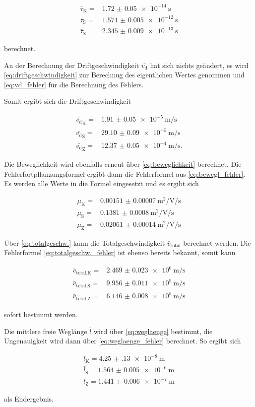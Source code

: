 \begin{align*}
    \bar{\tau}_\text{K} =& \SI{1.72(5)e-14}{\second} \\
    \bar{\tau}_\text{S} =& \SI{1.571(5)e-12}{\second} \\
    \bar{\tau}_\text{Z} =& \SI{2.345(9)e-13}{\second}
\end{align*}

berechnet.

An der Berechnung der Driftgeschwindigkeit $\bar{v_\text{d}}$ hat sich nichts geändert, es wird \autoref{eq:driftgeschwindigkeit} zur Berechnug des eigentlichen Wertes genommen und \autoref{eq:vd_fehler} für die Berechnung des Fehlers.

Somit ergibt sich die Driftgeschwindigkeit

\begin{align*}
    \bar{v_\text{d}}_\text{K} =& \SI{1.91(5)e-5}{\meter\per\second} \\
    \bar{v_\text{d}}_\text{S} =& \SI{29.10(9)e-5}{\meter\per\second} \\
    \bar{v_\text{d}}_\text{Z} =& \SI{12.37(5)e-4}{\meter\per\second}.
\end{align*}

Die Beweglichkeit wird ebenfalls erneut über \autoref{eq:beweglichkeit} berechnet.
Die Fehlerfortpflanzungsformel ergibt dann die Fehlerformel aus \autoref{eq:bewegl_fehler}.
Es werden alle Werte in die Formel eingesetzt und es ergibt sich 

\begin{align*}
    \mu _\text{K} =& \SI{0.00151(7)}{\meter\squared\per\volt\per\second}\\
    \mu _\text{S} =& \SI{0.1381(8)}{\meter\squared\per\volt\per\second}\\
    \mu _\text{Z} =& \SI{0.02061(14)}{\meter\squared\per\volt\per\second}
\end{align*}

Über \autoref{eq:totalgeschw.} kann die Totalgeschwindigkeit $\bar{v}_\text{total}$ berechnet werden.
Die Fehlerformel \autoref{eq:totalgeschw._fehler} ist ebenso bereits bekannt, somit kann 

\begin{align*}
    \bar{v}_\text{total,K} =& \SI{2.469(23)e6}{\meter\per\second}\\
    \bar{v}_\text{total,S} =& \SI{9.956(11)e5}{\meter\per\second}\\
    \bar{v}_\text{total,Z} =& \SI{6.146(8)e5}{\meter\per\second}
\end{align*}

sofort bestimmt werden.

Die mittlere freie Weglänge $\bar{l}$ wird über \autoref{eq:weglaenge} bestimmt, die Ungenauigkeit wird dann über \autoref{eq:weglaenge_fehler} berechnet.
So ergibt sich

\begin{align*}
    \bar{l}_\text{K} = \SI{4.25(13)e-8}{\meter}\\
    \bar{l}_\text{S} = \SI{1.564(5)e-6}{\meter}\\
    \bar{l}_\text{Z} = \SI{1.441(6)e-7}{\meter}
\end{align*}

als Endergebnis.